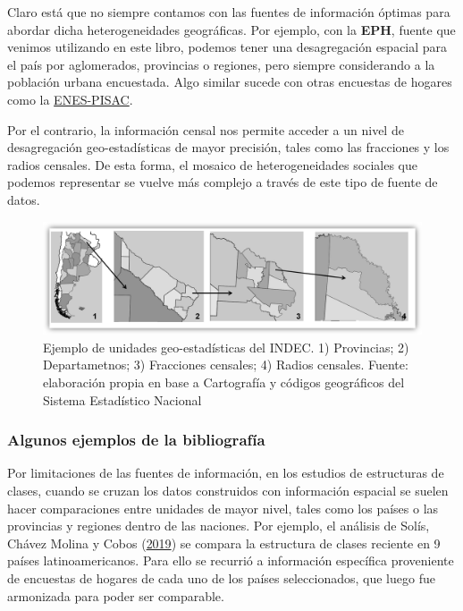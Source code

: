 \documentclass[
]{article}
\begin{document}
Claro está que no siempre contamos con las fuentes de información óptimas para abordar dicha heterogeneidades geográficas. Por ejemplo, con la \textbf{EPH}, fuente que venimos utilizando en este libro, podemos tener una desagregación espacial para el país por aglomerados, provincias o regiones, pero siempre considerando a la población urbana encuestada. Algo similar sucede con otras encuestas de hogares como la \href{https://www.argentina.gob.ar/ciencia/pisac/bases-de-datos}{ENES-PISAC}.

Por el contrario, la información censal nos permite acceder a un nivel de desagregación geo-estadísticas de mayor precisión, tales como las fracciones y los radios censales. De esta forma, el mosaico de heterogeneidades sociales que podemos representar se vuelve más complejo a través de este tipo de fuente de datos.

\begin{figure}

{\centering \includegraphics[width=1\linewidth]{imagenes_byn/formosa_radios} 

}

\caption{Ejemplo de unidades geo-estadísticas del INDEC. 1) Provincias; 2) Departametnos; 3) Fracciones censales; 4) Radios censales. Fuente: elaboración propia en base a Cartografía y códigos geográficos del Sistema Estadístico Nacional}\label{fig:unnamed-chunk-129}
\end{figure}

\hypertarget{algunos-ejemplos-de-la-bibliografuxeda-1}{%
\subsubsection{Algunos ejemplos de la bibliografía}\label{algunos-ejemplos-de-la-bibliografuxeda-1}}

Por limitaciones de las fuentes de información, en los estudios de estructuras de clases, cuando se cruzan los datos construidos con información espacial se suelen hacer comparaciones entre unidades de mayor nivel, tales como los países o las provincias y regiones dentro de las naciones. Por ejemplo, el análisis de Solís, Chávez Molina y Cobos (\protect\hyperlink{ref-Solis.etal2019}{2019}) se compara la estructura de clases reciente en 9 países latinoamericanos. Para ello se recurrió a información específica proveniente de encuestas de hogares de cada uno de los países seleccionados, que luego fue armonizada para poder ser comparable.
\end{document}
